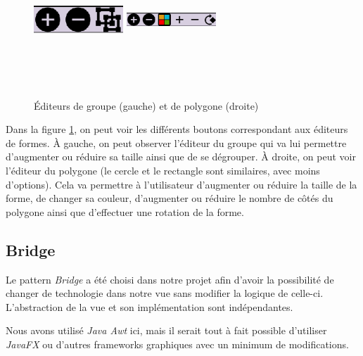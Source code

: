 \documentclass{article}
\begin{document}
\begin{figure}[h]
    \centering
    \includegraphics[width= 0.3\textwidth,height=5.0cm,keepaspectratio]{editorGroup.png}
    \includegraphics[width= 0.3\textwidth,height=5.0cm,keepaspectratio]{editorPolygon.png}
    \caption{Éditeurs de groupe (gauche) et de polygone (droite)}
    \label{MFicons}
\end{figure}
\FloatBarrier

Dans la figure \ref{MFicons}, on peut voir les différents boutons correspondant aux éditeurs de formes.
À gauche, on peut observer l'éditeur du groupe qui va lui permettre d'augmenter ou réduire sa taille ainsi que de se dégrouper.
À droite, on peut voir l'éditeur du polygone (le cercle et le rectangle sont similaires, avec moins d'options). Cela va permettre à l'utilisateur
d'augmenter ou réduire la taille de la forme, de changer sa couleur, d'augmenter ou réduire le nombre de côtés du polygone ainsi que d'effectuer une rotation de la forme.
\subsection{Bridge}

Le pattern \textit{Bridge} a été choisi dans notre projet afin d'avoir la possibilité de changer de technologie dans notre vue
 sans modifier la logique de celle-ci. L'abstraction de la vue et son implémentation sont indépendantes.

Nous avons utilisé \textit{Java Awt} ici, mais il serait tout à fait possible d'utiliser \textit{JavaFX} ou d'autres frameworks graphiques
avec un minimum de modifications.
\end{document}
